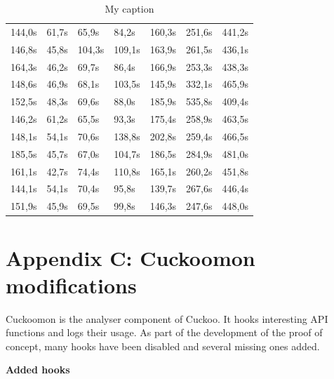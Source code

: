 \documentclass{scrartcl}
\begin{document}
\begin{table}[h]
\begin{tabular}{@{}lllllll@{}}
144,0s    & 61,7s      & 65,9s      & 84,2s       & 160,3s      & 251,6s      & 441,2s       \\
146,8s    & 45,8s      & 104,3s     & 109,1s      & 163,9s      & 261,5s      & 436,1s       \\
164,3s    & 46,2s      & 69,7s      & 86,4s       & 166,9s      & 253,3s      & 438,3s       \\
148,6s    & 46,9s      & 68,1s      & 103,5s      & 145,9s      & 332,1s      & 465,9s       \\
152,5s    & 48,3s      & 69,6s      & 88,0s       & 185,9s      & 535,8s      & 409,4s       \\
146,2s    & 61,2s      & 65,5s      & 93,3s       & 175,4s      & 258,9s      & 463,5s       \\
148,1s    & 54,1s      & 70,6s      & 138,8s      & 202,8s      & 259,4s      & 466,5s       \\
185,5s    & 45,7s      & 67,0s      & 104,7s      & 186,5s      & 284,9s      & 481,0s       \\
161,1s    & 42,7s      & 74,4s      & 110,8s      & 165,1s      & 260,2s      & 451,8s       \\
144,1s    & 54,1s      & 70,4s      & 95,8s       & 139,7s      & 267,6s      & 446,4s       \\
151,9s    & 45,9s      & 69,5s      & 99,8s       & 146,3s      & 247,6s      & 448,0s       \\ \bottomrule
\end{tabular}
\caption{My caption}
\label{my-label}
\end{table}

\clearpage

\section*{Appendix C: Cuckoomon modifications}
\label{cuckoomonmods}

Cuckoomon is the analyser component of Cuckoo. It hooks interesting API functions and logs their usage. As part of the development of the proof of concept, many hooks have been disabled and several missing ones added.

\textbf{Added hooks}
\end{document}
